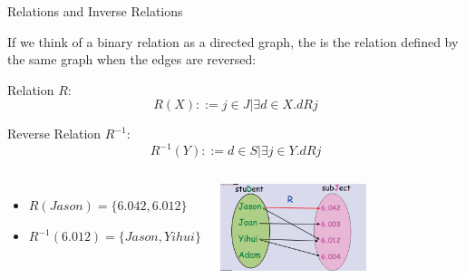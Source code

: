 \begin{frame}{Relations and Inverse Relations}

  If we think of a binary relation as a directed graph, the  is the relation defined by the same graph when the edges are reversed:\bigskip

  Relation $R$:
  \begin{equation*}
    R(X) ::= {j \in J | \exists d \in X. d R j}
  \end{equation*}

  Reverse Relation $R^{-1}$:
  \begin{equation*}
    R^{-1}(Y) ::= {d \in S | \exists j \in Y. d R j}
  \end{equation*}
  \bigskip

  \begin{columns}
    \begin{itemize}
      \item $R(Jason) = \{6.042, 6.012\}$
      \item $R^{-1}(6.012) = \{Jason, Yihui\}$
    \end{itemize}
    \begin{center}
      \includegraphics[width=0.6\textwidth]{../img/relations}
    \end{center}
  \end{columns}
\end{frame}

